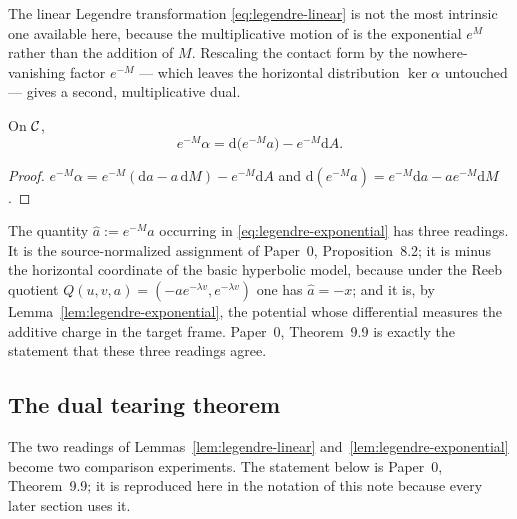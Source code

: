 The linear Legendre transformation \eqref{eq:legendre-linear} is not the most
intrinsic one available here, because the multiplicative motion of \AEG{} is the
exponential $e^{M}$ rather than the addition of $M$.  Rescaling the contact
form by the nowhere-vanishing factor $e^{-M}$ --- which leaves the horizontal
distribution $\ker\alpha$ untouched --- gives a second, multiplicative dual.

\begin{lemma}
\label{lem:legendre-exponential}
On $\mathcal{C}$,
\begin{equation}\label{eq:legendre-exponential}
  e^{-M}\alpha=\mathrm d\bigl(e^{-M}a\bigr)-e^{-M}\mathrm dA .
\end{equation}
\end{lemma}

\begin{proof}
$e^{-M}\alpha=e^{-M}(\mathrm da-a\,\mathrm dM)-e^{-M}\mathrm dA$ and
$\mathrm d(e^{-M}a)=e^{-M}\mathrm da-a e^{-M}\mathrm dM$.
\end{proof}

\begin{remark}
\label{rem:hat-a}
The quantity $\hat a:=e^{-M}a$ occurring in \eqref{eq:legendre-exponential} has
three readings.  It is the source-normalized assignment of Paper~0,
Proposition~8.2; it is minus the horizontal coordinate of the basic hyperbolic
model, because under the Reeb quotient
$Q(u,v,a)=(-ae^{-\lambda v},e^{-\lambda v})$ one has $\hat a=-x$; and it is, by
Lemma~\ref{lem:legendre-exponential}, the potential whose differential measures
the additive charge in the target frame.  Paper~0, Theorem~9.9 is exactly the
statement that these three readings agree.
\end{remark}

\subsection{The dual tearing theorem}

The two readings of Lemmas~\ref{lem:legendre-linear}
and~\ref{lem:legendre-exponential} become two comparison experiments.  The
statement below is Paper~0, Theorem~9.9; it is reproduced here in the notation
of this note because every later section uses it.

